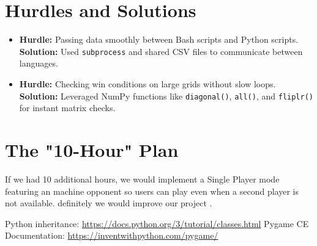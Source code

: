 \documentclass[10pt]{article}
\begin{document}
    \section{Hurdles and Solutions}
    \begin{itemize}
        \item \textbf{Hurdle:} Passing data smoothly between Bash scripts and Python scripts. \\
        \textbf{Solution:} Used \texttt{subprocess} and shared CSV files to communicate between languages.
        \item \textbf{Hurdle:} Checking win conditions on large grids without slow loops. \\ 
        \textbf{Solution:} Leveraged NumPy functions like \texttt{diagonal()}, \texttt{all()}, and \texttt{fliplr()} for instant matrix checks.
    \end{itemize}

    \section{The "10-Hour" Plan}
    If we had 10 additional hours, we would implement a Single Player mode featuring an machine opponent so users can play even when a second player is not available.
    definitely we would improve our project .

    \begin{thebibliography}{}
         Python inheritance: \url{https://docs.python.org/3/tutorial/classes.html}
         Pygame CE Documentation: \url{https://inventwithpython.com/pygame/}
    \end{thebibliography}
\end{document}
